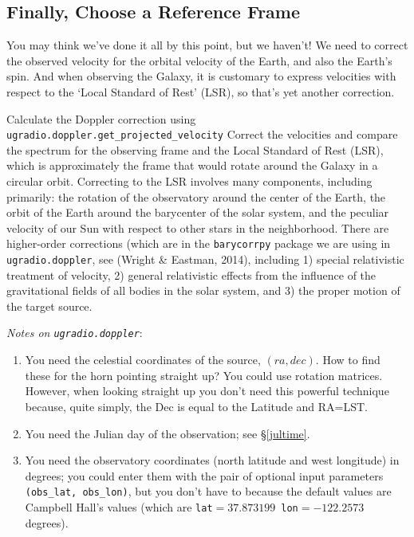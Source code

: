 \documentclass[12pt,preprint]{aastex}
\begin{document}
\subsection{Finally, Choose a Reference Frame}
You may think we've done it all by this point, but we haven't! We need
to correct the observed velocity for the orbital velocity of the Earth,
and also the Earth's spin. And when observing the Galaxy, it is
customary to express velocities with respect to the `Local Standard of
Rest' (LSR), so that's yet another correction.

Calculate the Doppler correction using {\tt ugradio.doppler.get\_projected\_velocity} 
Correct the velocities and compare the spectrum for the observing frame
and the Local Standard of Rest (LSR), which is approximately the frame that would rotate
around the Galaxy in a circular orbit.  Correcting to the LSR involves many components,
including primarily: the rotation of the observatory around the center of the Earth, the
orbit of the Earth around the barycenter of the solar system, and the peculiar velocity
of our Sun with respect to other stars in the neighborhood.  There are higher-order
corrections (which are in the {\tt barycorrpy} package we are using in {\tt ugradio.doppler},
see (Wright \& Eastman, 2014), including 1) special relativistic treatment of velocity,
2) general relativistic effects from the influence of the gravitational fields of all bodies
in the solar system, and 3) the proper motion of the target source.

{\it Notes on \verb$ugradio.doppler$}: \begin{enumerate}

\item You need the celestial coordinates of the source, $(ra, dec)$. How
  to find these for the horn pointing straight up? You could use
  rotation matrices. However, when looking straight up you don't need
  this powerful technique because, quite simply, the Dec is equal to the
  Latitude and RA=LST.

\item You need the Julian day of the observation; see \S \ref{jultime}.

\item You need the observatory coordinates (north latitude and west
  longitude) in degrees; you could enter them with the pair of optional
  input parameters {\tt (obs\_lat, obs\_lon)}, but you don't have to because
  the default values are Campbell Hall's values (which are {\tt lat$=37.873199$
  lon$=-122.2573$} degrees).

\end{enumerate}
\end{document}
